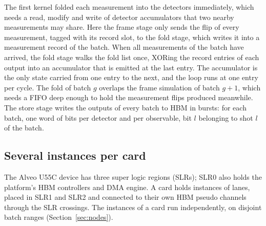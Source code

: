 The first kernel folded each measurement into the detectors immediately, which needs a read, modify and write of
detector accumulators that two nearby measurements may share. Here the frame stage only sends the flip of every
measurement, tagged with its record slot, to the fold stage, which writes it into a measurement record of the batch.
When all measurements of the batch have arrived, the fold stage walks the fold list once, XORing the record entries
of each output into an accumulator that is emitted at the last entry. The accumulator is the only state carried from
one entry to the next, and the loop runs at one entry per cycle. The fold of batch $g$ overlaps the frame simulation
of batch $g+1$, which needs a FIFO deep enough to hold the measurement flips produced meanwhile. The store stage
writes the outputs of every batch to HBM in bursts: for each batch, one word of \NumLanes{} bits per detector and per
observable, bit $l$ belonging to shot $l$ of the batch.

\subsection{Several instances per card}\label{sec:instances}

The Alveo U55C device has three super logic regions (SLRs); SLR0 also holds the platform's HBM controllers and DMA
engine. A card holds \NumInstancesPerCard{} instances of \NumLanes{} lanes, placed in SLR1 and SLR2 and connected to
their own HBM pseudo channels through the SLR crossings. The
instances of a card run independently, on disjoint batch ranges (Section~\ref{sec:nodes}).
